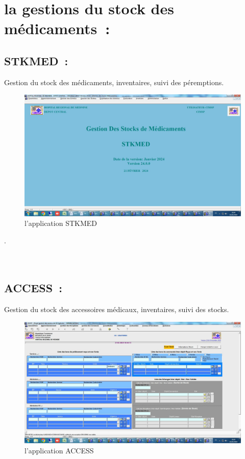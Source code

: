 \documentclass[12pt]{rapportINPTCLOUD}
\begin{document}
	\section{\textcolor{sectioncolor}{la gestions du stock des médicaments :}}

\subsection{STKMED :} Gestion du stock des médicaments, inventaires, suivi des péremptions.
\begin{figure}[H]
	\centering
	\includegraphics[width=1\linewidth]{img/m.jpg}
	\caption{l'application STKMED}
	\label{fig:STKMED}
\end{figure}
 .\\ \\ \\
\subsection{ACCESS :} Gestion du stock des accessoires médicaux, inventaires, suivi des stocks.
\begin{figure}[H]
	\centering
	\includegraphics[width=1\linewidth]{img/n.jpg}
	\caption{l'application ACCESS}
	\label{fig:ACCESS}
\end{figure}
\end{document}
